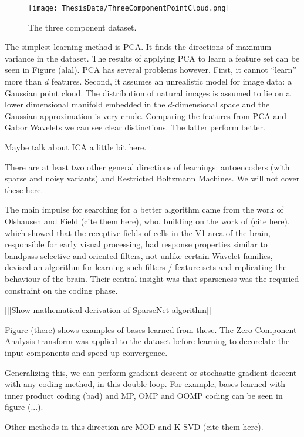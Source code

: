 \documentclass[12pt,a4paper,oneside,english]{UPBThesis}
\begin{document}
\begin{figure}
\centering
\texttt{[image: ThesisData/ThreeComponentPointCloud.png]}
\caption{The three component dataset.}
\label{fig:ThreeComponentPointColud}
\end{figure}

The simplest learning method is PCA. It finds the directions of maximum variance in the dataset. The results of applying PCA to learn a feature set can be seen in Figure (alal). PCA has several problems however. First, it cannot ``learn'' more than $d$ features. Second, it assumes an unrealistic model for image data: a Gaussian point cloud. The distribution of natural images is assumed to lie on a lower dimensional manifold embedded in the $d$-dimensional space and the Gaussian approximation is very crude. Comparing the features from PCA and Gabor Wavelets we can see clear distinctions. The latter perform better.

Maybe talk about ICA a little bit here.

There are at least two other general directions of learnings: autoencoders (with sparse and noisy variants) and Restricted Boltzmann Machines. We will not cover these here.

The main impulse for searching for a better algorithm came from the work of Olshausen and Field (cite them here), who, building on the work of (cite here), which showed that the receptive fields of cells in the V1 area of the brain, responsible for early visual processing, had response properties similar to bandpass selective and oriented filters, not unlike certain Wavelet families, devised an algorithm for learning such filters / feature sets and replicating the behaviour of the brain. Their central insight was that sparseness was the requried constraint on the coding phase.

[[[Show mathematical derivation of SparseNet algorithm]]]

Figure (there) shows examples of bases learned from these. The Zero Component Analysis transform was applied to the dataset before learning to decorelate the input components and speed up convergence.

Generalizing this, we can perform gradient descent or stochastic gradient descent with any coding method, in this double loop. For example, bases learned with inner product coding (bad) and MP, OMP and OOMP coding can be seen in figure (...).

Other methods in this direction are MOD and K-SVD (cite them here).
\end{document}
